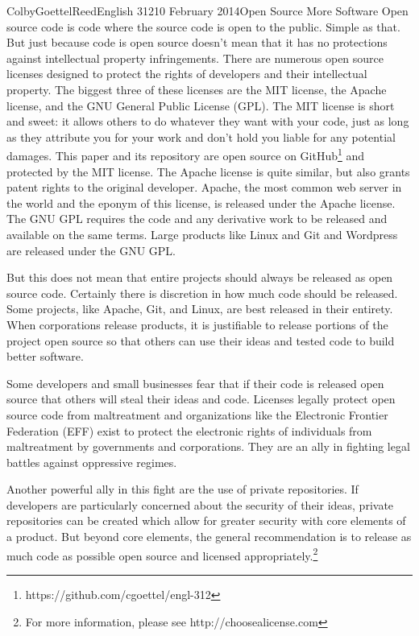 \documentclass[12pt]{article}
\begin{document}
\begin{mla}{Colby}{Goettel}{Reed}{English 312}{10 February 2014}{Open Source More Software}
Open source code is code where the source code is open to the public. Simple as that. But just because code is open source doesn't mean that it has no protections against intellectual property infringements. There are numerous open source licenses designed to protect the rights of developers and their intellectual property. The biggest three of these licenses are the MIT license, the Apache license, and the GNU General Public License (GPL). The MIT license is short and sweet: it allows others to do whatever they want with your code, just as long as they attribute you for your work and don't hold you liable for any potential damages. This paper and its repository are open source on GitHub\footnote{https://github.com/cgoettel/engl-312} and protected by the MIT license. The Apache license is quite similar, but also grants patent rights to the original developer. Apache, the most common web server in the world and the eponym of this license, is released under the Apache license. The GNU GPL requires the code and any derivative work to be released and available on the same terms. Large products like Linux and Git and Wordpress are released under the GNU GPL.

But this does not mean that entire projects should always be released as open source code. Certainly there is discretion in how much code should be released. Some projects, like Apache, Git, and Linux, are best released in their entirety. When corporations release products, it is justifiable to release portions of the project open source so that others can use their ideas and tested code to build better software.

Some developers and small businesses fear that if their code is released open source that others will steal their ideas and code. Licenses legally protect open source code from maltreatment and organizations like the Electronic Frontier Federation (EFF) exist to protect the electronic rights of individuals from maltreatment by governments and corporations. They are an ally in fighting legal battles against oppressive regimes.

Another powerful ally in this fight are the use of private repositories. If developers are particularly concerned about the security of their ideas, private repositories can be created which allow for greater security with core elements of a product. But beyond core elements, the general recommendation is to release as much code as possible open source and licensed appropriately.\footnote{For more information, please see http://choosealicense.com}


\end{mla}
\end{document}
